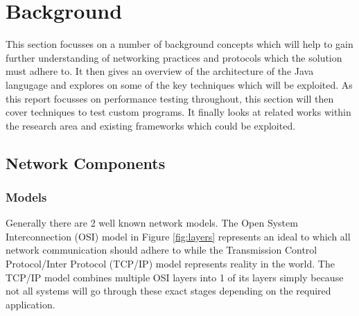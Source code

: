 \documentclass[final_report.tex]{subfiles}
\begin{document}

\section{Background}
\label{sec:background}

This section focusses on a number of background concepts which will help to gain further understanding of networking practices and protocols which the solution must adhere to. It then gives an overview of the architecture of the Java langugage and explores on some of the key techniques which will be exploited. As this report focusses on performance testing throughout, this section will then cover techniques to test custom programs. It finally looks at related works within the research area and existing frameworks which could be exploited.

\subsection{Network Components}


\subsubsection{Models}
\label{sec:models}
Generally there are 2 well known network models. The Open System Interconnection (OSI) model in Figure \ref{fig:layers} represents an ideal to which all network communication should adhere to while the Transmission Control Protocol/Inter Protocol (TCP/IP) model represents reality in the world. The TCP/IP model combines multiple OSI layers into 1 of its layers simply because not all systems will go through these exact stages depending on the required  application.
\end{document}

